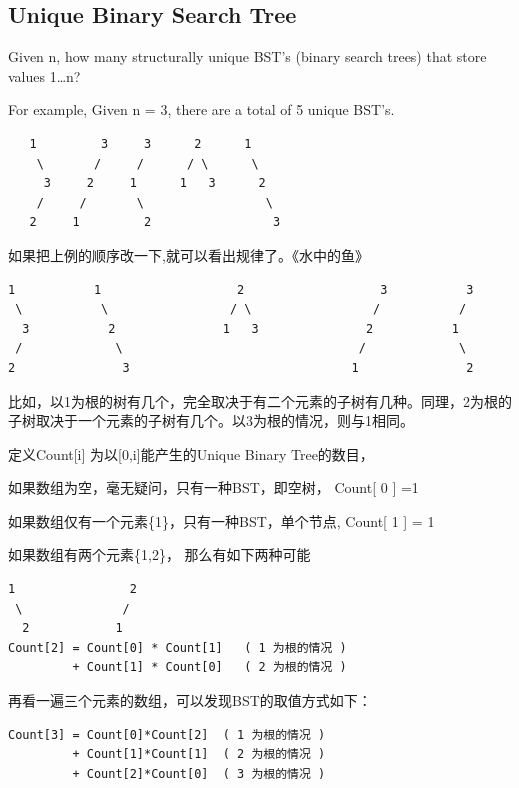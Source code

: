 \documentclass[12pt]{book}
\begin{document}
\subsection{Unique Binary Search Tree}
\label{sec-14-2-4}
Given n, how many structurally unique BST's (binary search trees) that store values 1\ldots{}n?

For example, Given n = 3, there are a total of 5 unique BST's.
\lstset{language=java,label= ,caption= ,numbers=none}
\begin{lstlisting}
   1         3     3      2      1
    \       /     /      / \      \
     3     2     1      1   3      2
    /     /       \                 \
   2     1         2                 3
\end{lstlisting}

如果把上例的顺序改一下,就可以看出规律了。《水中的鱼》
\lstset{language=java,label= ,caption= ,numbers=none}
\begin{lstlisting}
1           1                   2                   3           3
 \           \                 / \                 /           / 
  3           2               1   3               2           1
 /             \                                 /             \
2               3                               1               2
\end{lstlisting}

比如，以1为根的树有几个，完全取决于有二个元素的子树有几种。同理，2为根的子树取决于一个元素的子树有几个。以3为根的情况，则与1相同。

定义Count[i] 为以[0,i]能产生的Unique Binary Tree的数目，

如果数组为空，毫无疑问，只有一种BST，即空树， Count[ 0 ] =1

如果数组仅有一个元素\{1\}，只有一种BST，单个节点, Count[ 1 ] = 1

如果数组有两个元素\{1,2\}， 那么有如下两种可能
\lstset{language=java,label= ,caption= ,numbers=none}
\begin{lstlisting}
1                2
 \              /
  2            1
Count[2] = Count[0] * Count[1]   ( 1 为根的情况 )
         + Count[1] * Count[0]   ( 2 为根的情况 )
\end{lstlisting}

再看一遍三个元素的数组，可以发现BST的取值方式如下：
\lstset{language=java,label= ,caption= ,numbers=none}
\begin{lstlisting}
Count[3] = Count[0]*Count[2]  ( 1 为根的情况 )
         + Count[1]*Count[1]  ( 2 为根的情况 )
         + Count[2]*Count[0]  ( 3 为根的情况 )
\end{lstlisting}
\end{document}
